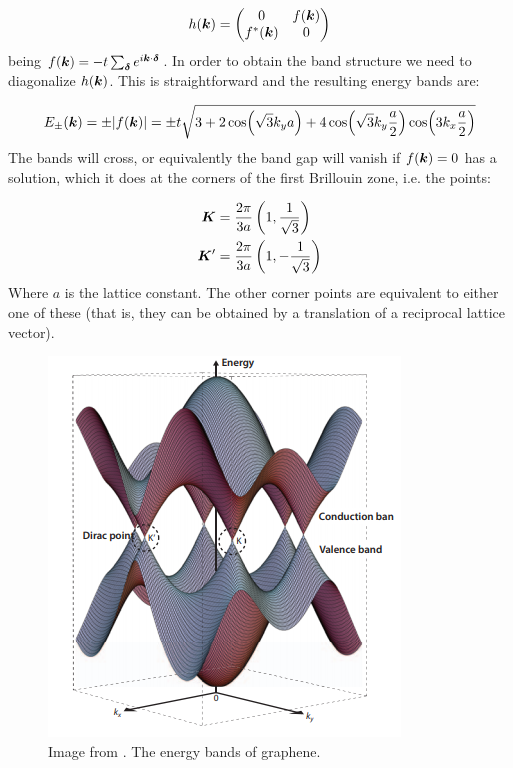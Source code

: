 \begin{equation}
h(\boldsymbol{k}) = \begin{pmatrix}
    0 & f(\boldsymbol{k}) \\
    f^*(\boldsymbol{k}) & 0
\end{pmatrix}
\end{equation}
being $f(\boldsymbol{k}) = -t\sum_{\boldsymbol{\delta}} e^{i\boldsymbol{k}\cdot\boldsymbol{\delta}}$. In order to obtain the band structure we need to diagonalize $h(\boldsymbol{k})$. This is straightforward and the resulting energy bands are:

\begin{equation}
E_{\pm}(\boldsymbol{k}) = \pm|f(\boldsymbol{k})| = \pm t\sqrt{3+2\cos(\sqrt{3}k_ya) +4\cos(\sqrt{3}k_y\frac{a}{2})\cos(3k_x\frac{a}{2})}
\end{equation}
The bands will cross, or equivalently the band gap will vanish if $f(\boldsymbol{k})=0$ has a solution, which it does at the corners of the first Brillouin zone, i.e. the points:

\begin{align*}
\boldsymbol{K} &= \frac{2\pi}{3a}\left( 1, \frac{1}{\sqrt{3}}\right) \\
\boldsymbol{K}' &= \frac{2\pi}{3a}\left( 1, -\frac{1}{\sqrt{3}}\right) 
\end{align*}
Where $a$ is the lattice constant. The other corner points are equivalent to either one of these (that is, they can be obtained by a translation of a reciprocal lattice vector).

\begin{figure}
\centering
  \includegraphics[width=0.7\linewidth]{../Figures/graphene_bands.png}
  \caption{Image from \cite{Ando2009}. The energy bands of graphene.} 
\label{FigD1}
\end{figure}


